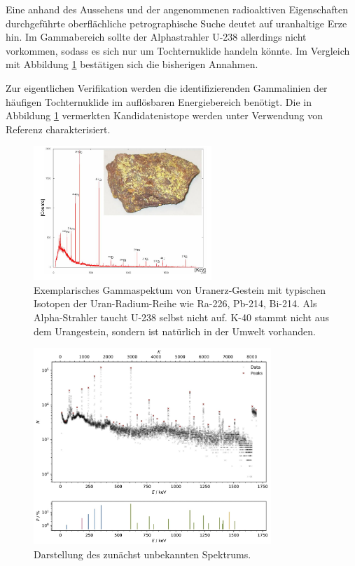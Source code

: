 Eine anhand des Aussehens und der angenommenen radioaktiven Eigenschaften durchgeführte oberflächliche petrographische Suche
deutet auf uranhaltige Erze hin. Im Gammabereich sollte der Alphastrahler U-238 allerdings nicht vorkommen, sodass es sich nur
um Tochternuklide handeln könnte. Im Vergleich mit Abbildung \ref{fig:SpekU} bestätigen sich die bisherigen Annahmen. 

Zur eigentlichen Verifikation werden die identifizierenden Gammalinien der häufigen Tochternuklide im auflösbaren Energiebereich
benötigt. Die in Abbildung \ref{fig:SpekU} vermerkten Kandidatenistope werden unter Verwendung von Referenz \cite{iaea_recom} 
charakterisiert.

\begin{figure}[H]
    \centering
    \includegraphics[width=0.6\textwidth]{content/grafik/Gammaspektrum_Uranerz.jpg}
    \captionsetup{width=.95\linewidth}
    \caption{Exemplarisches Gammaspektum von Uranerz-Gestein mit typischen Isotopen der Uran-Radium-Reihe
             wie Ra-226, Pb-214, Bi-214. Als Alpha-Strahler taucht U-238 selbst nicht auf. K-40 stammt
             nicht aus dem Urangestein, sondern ist natürlich in der Umwelt vorhanden. \cite{gamma_uran}}
    \label{fig:SpekU}
\end{figure}

\begin{figure}[H]
    \centering
    \includegraphics[width=0.8\textwidth]{content/plots/plot11.jpg}
    \caption{Darstellung des zunächst unbekannten Spektrums.}
    \label{fig:plot11}
\end{figure}

